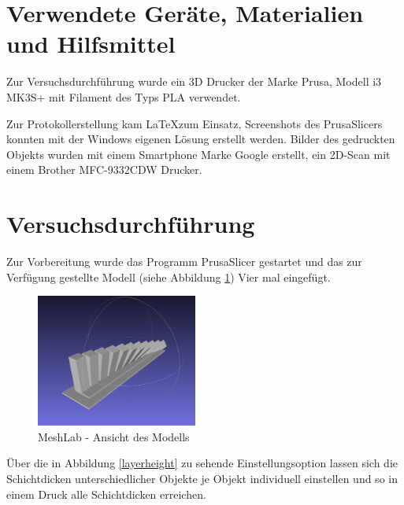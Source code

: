 \documentclass[a4paper,12pt,bibtotocnumbered]{scrartcl}
\numberwithin{equation}{section} %
\begin{document}
\section[Verwendete Geräte, Materialien und Hilfsmittel]{Verwendete Geräte, Materialien und Hilfsmittel}

Zur Versuchsdurchführung wurde ein 3D Drucker der Marke Prusa, Modell i3 MK3S+ mit Filament des Typs PLA verwendet. 

Zur Protokollerstellung kam \LaTeX\;zum Einsatz, Screenshots des PrusaSlicers konnten mit der Windows eigenen Lösung erstellt werden. Bilder des gedruckten Objekts wurden mit einem Smartphone Marke Google erstellt, ein 2D-Scan mit einem Brother MFC-9332CDW Drucker.

\newpage

\section[Versuchsdurchführung]{Versuchsdurchführung}

Zur Vorbereitung wurde das Programm PrusaSlicer gestartet und das zur Verfügung gestellte Modell (siehe Abbildung \ref*{model}) Vier mal eingefügt. 


\begin{figure}[H]
\centerline{\includegraphics[width=200px]{./images/model.png}}
\caption{MeshLab - Ansicht des Modells}
\label{model}
\end{figure}

Über die in Abbildung \ref*{layerheight} zu sehende Einstellungsoption lassen sich die Schichtdicken unterschiedlicher Objekte je Objekt individuell einstellen und so in einem Druck alle Schichtdicken erreichen.
\end{document}
